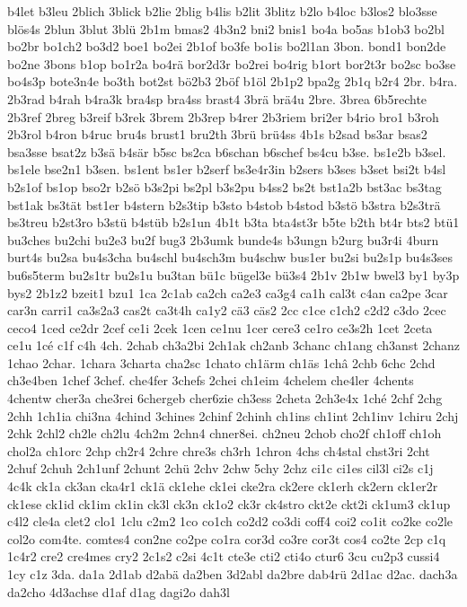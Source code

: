 {b4let
b3leu
2blich
3blick
b2lie
2blig
b4lis
b2lit
3blitz
b2lo
b4loc
b3los2
blo3sse
blös4s
2blun
3blut
3blü
2b1m
bmas2
4b3n2
bni2
bnis1
bo4a
bo5as
b1ob3
bo2bl
bo2br
bo1ch2
bo3d2
boe1
bo2ei
2b1of
bo3fe
bo1is
bo2l1an
3bon.
bond1
bon2de
bo2ne
3bons
b1op
bo1r2a
bo4rä
bor2d3r
bo2rei
bo4rig
b1ort
bor2t3r
bo2sc
bo3se
bo4s3p
bote3n4e
bo3th
bot2st
bö2b3
2böf
b1öl
2b1p2
bpa2g
2b1q
b2r4
2br.
b4ra.
2b3rad
b4rah
b4ra3k
bra4sp
bra4ss
brast4
3brä
brä4u
2bre.
3brea
6b5rechte
2b3ref
2breg
b3reif
b3rek
3brem
2b3rep
b4rer
2b3riem
bri2er
b4rio
bro1
b3roh
2b3rol
b4ron
b4ruc
bru4s
brust1
bru2th
3brü
brü4ss
4b1s
b2sad
bs3ar
bsas2
bsa3sse
bsat2z
b3sä
b4sär
b5sc
bs2ca
b6schan
b6schef
bs4cu
b3se.
bs1e2b
b3sel.
bs1ele
bse2n1
b3sen.
bs1ent
bs1er
b2serf
bs3e4r3in
b2sers
b3ses
b3set
bsi2t
b4sl
b2s1of
bs1op
bso2r
b2sö
b3s2pi
bs2pl
b3s2pu
b4ss2
bs2t
bst1a2b
bst3ac
bs3tag
bst1ak
bs3tät
bst1er
b4stern
b2s3tip
b3sto
b4stob
b4stod
b3stö
b3stra
b2s3trä
bs3treu
b2st3ro
b3stü
b4stüb
b2s1un
4b1t
b3ta
bta4st3r
b5te
b2th
bt4r
bts2
btü1
bu3ches
bu2chi
bu2e3
bu2f
bug3
2b3umk
bunde4s
b3ungn
b2urg
bu3r4i
4burn
burt4s
bu2sa
bu4s3cha
bu4schl
bu4sch3m
bu4schw
bus1er
bu2si
bu2s1p
bu4s3ses
bu6s5term
bu2s1tr
bu2s1u
bu3tan
bü1c
bügel3e
bü3s4
2b1v
2b1w
bwel3
by1
by3p
bys2
2b1z2
bzeit1
bzu1
1ca
2c1ab
ca2ch
ca2e3
ca3g4
ca1h
cal3t
c4an
ca2pe
3car
car3n
carri1
ca3s2a3
cas2t
ca3t4h
ca1y2
cä3
cäs2
2cc
c1ce
c1ch2
c2d2
c3do
2cec
ceco4
1ced
ce2dr
2cef
ce1i
2cek
1cen
ce1nu
1cer
cere3
ce1ro
ce3s2h
1cet
2ceta
ce1u
1cé
c1f
c4h
4ch.
2chab
ch3a2bi
2ch1ak
ch2anb
3chanc
ch1ang
ch3anst
2chanz
1chao
2char.
1chara
3charta
cha2sc
1chato
ch1ärm
ch1äs
1châ
2chb
6chc
2chd
ch3e4ben
1chef
3chef.
che4fer
3chefs
2chei
ch1eim
4chelem
che4ler
4chents
4chentw
cher3a
che3rei
6chergeb
cher6zie
ch3ess
2cheta
2ch3e4x
1ché
2chf
2chg
2chh
1ch1ia
chi3na
4chind
3chines
2chinf
2chinh
ch1ins
ch1int
2ch1inv
1chiru
2chj
2chk
2chl2
ch2le
ch2lu
4ch2m
2chn4
chner8ei.
ch2neu
2chob
cho2f
ch1off
ch1oh
chol2a
ch1orc
2chp
ch2r4
2chre
chre3s
ch3rh
1chron
4chs
ch4stal
chst3ri
2cht
2chuf
2chuh
2ch1unf
2chunt
2chü
2chv
2chw
5chy
2chz
ci1c
ci1es
cil3l
ci2s
c1j
4c4k
ck1a
ck3an
cka4r1
ck1ä
ck1ehe
ck1ei
cke2ra
ck2ere
ck1erh
ck2ern
ck1er2r
ck1ese
ck1id
ck1im
ck1in
ck3l
ck3n
ck1o2
ck3r
ck4stro
ckt2e
ckt2i
ck1um3
ck1up
c4l2
cle4a
clet2
clo1
1clu
c2m2
1co
co1ch
co2d2
co3di
coff4
coi2
co1it
co2ke
co2le
col2o
com4te.
comtes4
con2ne
co2pe
co1ra
cor3d
co3re
cor3t
cos4
co2te
2cp
c1q
1c4r2
cre2
cre4mes
cry2
2c1s2
c2si
4c1t
cte3e
cti2
cti4o
ctur6
3cu
cu2p3
cussi4
1cy
c1z
3da.
da1a
2d1ab
d2abä
da2ben
3d2abl
da2bre
dab4rü
2d1ac
d2ac.
dach3a
da2cho
4d3achse
d1af
d1ag
dagi2o
dah3l
}
